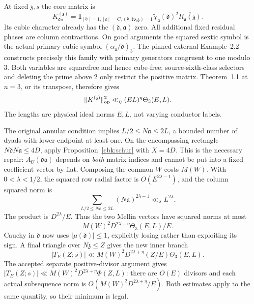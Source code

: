 At fixed $\mathfrak z,s$ the core matrix is
\begin{equation}\label{cbk:cubic-matrix}
 K^{(\mathfrak z)}_{\mathfrak d\mathfrak a}
 =\mathbf1_{[\mathfrak d]=1,[\mathfrak a]=C,
                     (\mathfrak d,\mathfrak k\mathfrak v_2\mathfrak z)=1}
      \widetilde\chi_{\mathfrak a}(\mathfrak d)^2
                                \overline{R_{\mathfrak a}(\mathfrak z)}.
\end{equation}
Its cubic character already has the $(\mathfrak d,\mathfrak a)$ zero.
All additional fixed residual phases are column contractions. On
good arguments the squared sextic symbol is the actual primary
cubic symbol $(\alpha_{\mathfrak a}/\mathfrak d)_3$.
The pinned external Example~2.2 constructs precisely this family
with primary generators congruent to one modulo $3$. Both variables
are squarefree and hence cube-free; source-sixth-class selectors
and deleting the prime above $2$ only restrict the positive matrix.
Theorem~1.1 at $n=3$, or its transpose, therefore gives
\begin{equation}\label{cbk:cubic-norm}
 \|K^{(\mathfrak z)}\|_{\rm op}^2
                \ll_\eta(EL)^\eta\Theta_3(E,L).
\end{equation}
The lengths are physical ideal norms $E,L$, not varying conductor
labels.

The original annular condition implies
$L/2\le N\mathfrak a\le2L$, a bounded number of dyads with lower
endpoint at least one. On the encompassing rectangle
$N\mathfrak dN\mathfrak a\le4D$, apply
Proposition~\ref{cbk:schur} with $X=4D$. This is the necessary
repair: $A_U(\mathfrak d\mathfrak a)$ depends on \emph{both} matrix
indices and cannot be put into a fixed coefficient vector by fiat.
Composing the common $W$ costs $M(W)$.
With $0<\lambda<1/2$, the squared row radial factor is
$O(E^{2\lambda-1})$, and the column squared norm is
\[
 \sum_{L/2\le N\mathfrak a\le2L}(N\mathfrak a)^{2\lambda-1}
                                      \ll_\lambda L^{2\lambda}.
\]
The product is $D^{2\lambda}/E$. Thus the two Mellin vectors have
squared norms at most
\[
 M(W)^2D^{2\lambda+\eta}\Theta_3(E,L)/E.
\]
Cauchy in $\mathfrak d$ now uses $|\mu(\mathfrak d)|\le1$, explicitly
losing rather than exploiting its sign. A final triangle over
$N\mathfrak z\le Z$ gives the new inner branch
\begin{equation}\label{cbk:cubic-inner}
 |T_E(Z;s)|\ll M(W)^2D^{2\lambda+\eta}
                                      (Z/E)\Theta_3(E,L).
\end{equation}
The accepted separate positive-divisor argument gives
$|T_E(Z;s)|\ll M(W)^2D^{2\lambda+\eta}\Phi(Z,L)$: there are
$O(E)$ divisors and each actual subsequence norm is
$O(M(W)^2D^{2\lambda+\eta}/E)$. Both estimates apply to the same
quantity, so their minimum is legal.


